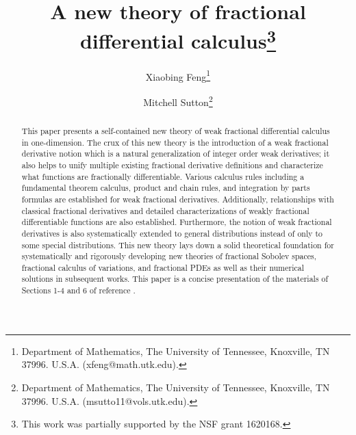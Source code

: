 \documentclass[leqno,final]{siamltex}
\numberwithin{equation}{section}
\renewcommand{\(}{\bigl(}
\renewcommand{\)}{\bigr)}
\begin{document}
\title{A new theory of fractional differential calculus\thanks{This work was partially supported by the NSF grant 1620168.} }

%
	
\author{Xiaobing Feng\thanks{Department of Mathematics, The University of Tennessee, 
Knoxville, TN 37996. U.S.A. (xfeng@math.utk.edu).}
\and{Mitchell Sutton}\thanks{Department of Mathematics, The University of Tennessee, 
Knoxville, TN 37996. U.S.A. (msutto11@vols.utk.edu).} }

\date{}

\maketitle
 
\thispagestyle{empty}

\begin{abstract}
    This paper presents a self-contained new theory of weak fractional differential calculus in one-dimension.
    The crux of this new theory is the introduction of a weak fractional derivative notion which is a natural generalization of integer order weak derivatives; it also helps to unify multiple existing fractional derivative definitions and characterize what functions are fractionally differentiable. Various calculus rules including a fundamental theorem calculus, product and chain rules, and integration by parts formulas are established for weak fractional derivatives. 
    Additionally, relationships with classical fractional derivatives and detailed characterizations  of weakly fractional differentiable functions are also established.
    Furthermore, the notion of weak fractional derivatives is also systematically extended to general distributions instead of only to some special distributions. 
    This new theory lays down a solid theoretical foundation for systematically and rigorously developing new theories of fractional Sobolev spaces, fractional calculus of variations, and fractional PDEs as well as their numerical solutions in subsequent works. 
    This paper is a concise presentation of the materials of Sections 1-4 and 6 of reference 
    \cite{Feng_Sutton}. 
    
\end{abstract}
\end{document}
